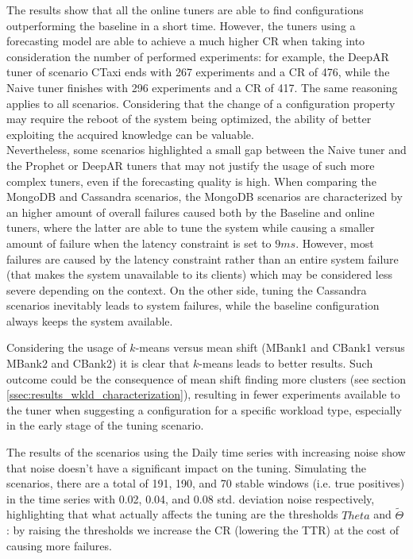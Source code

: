 \documentclass[a4paper, 12pt]{article} %
\begin{document}
	The results show that all the online tuners are able to find configurations outperforming the baseline in a short time. However, the tuners using a forecasting model are able to achieve a much higher CR when taking into consideration the number of performed experiments: for example, the DeepAR tuner of scenario CTaxi ends with 267 experiments and a CR of 476, while the Naive tuner finishes with 296 experiments and a CR of 417. The same reasoning applies to all scenarios. Considering that the change of a configuration property may require the reboot of the system being optimized, the ability of better exploiting the acquired knowledge can be valuable. \\
	Nevertheless, some scenarios highlighted a small gap between the Naive tuner and the Prophet or DeepAR tuners that may not justify the usage of such more complex tuners, even if the forecasting quality is high.
	When comparing the MongoDB and Cassandra scenarios, the MongoDB scenarios are characterized by an higher amount of overall failures caused both by the Baseline and online tuners, where the latter are able to tune the system while causing a smaller amount of failure when the latency constraint is set to $9ms$. However, most failures are caused by the latency constraint rather than an entire system failure (that makes the system unavailable to its clients) which may be considered less severe depending on the context. On the other side, tuning the Cassandra scenarios inevitably leads to system failures, while the baseline configuration always keeps the system available. 
	
	Considering the usage of $k$-means versus mean shift (MBank1 and CBank1 versus MBank2 and CBank2) it is clear that $k$-means leads to better results. Such outcome could be the consequence of mean shift finding more clusters (see section \ref{ssec:results_wkld_characterization}), resulting in fewer experiments available to the tuner when suggesting a configuration for a specific workload type, especially in the early stage of the tuning scenario. 

	The results of the scenarios using the Daily time series with increasing noise show that noise doesn't have a significant impact on the tuning. Simulating the scenarios, there are a total of 191, 190, and 70 stable windows (i.e. true positives) in the time series with 0.02, 0.04, and 0.08 std. deviation noise respectively, highlighting that  what actually affects the tuning are the thresholds $Theta$ and $\tilde{\Theta}$: by raising the thresholds we increase the CR (lowering the TTR) at the cost of causing more failures. 
	
\end{document}
